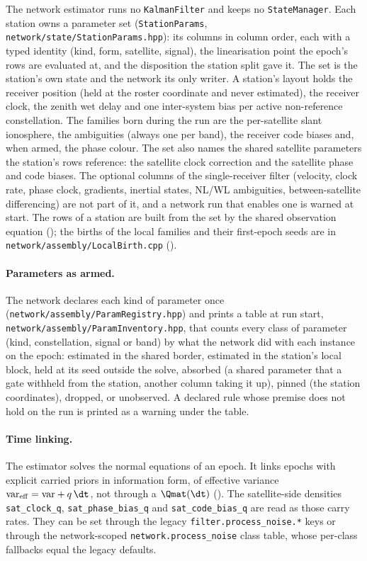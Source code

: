The network estimator runs no \texttt{KalmanFilter} and keeps no
\texttt{StateManager}.  Each station owns a parameter set
(\texttt{StationParams}, \texttt{network/state/StationParams.hpp}): its
columns in column order, each with a typed identity (kind, form, satellite,
signal), the linearisation point the epoch's rows are evaluated at, and the
disposition the station split gave it.  The set is the station's own state
and the network its only writer.  A station's layout holds the receiver
position (held at the roster coordinate and never estimated), the receiver
clock, the zenith wet delay and one inter-system bias per active
non-reference constellation.  The families born during the run are the
per-satellite slant ionosphere, the ambiguities (always one per band), the
receiver code biases and, when armed, the phase colour.  The set also names
the shared satellite parameters the station's rows reference: the satellite
clock correction and the satellite phase and code biases.  The optional
columns of the single-receiver filter (velocity, clock rate, phase clock,
gradients, inertial states, NL/WL ambiguities, between-satellite
differencing) are not part of it, and a network run that enables one is
warned at start.  The rows of a station are built from the set by the
shared observation equation (); the births of the
local families and their first-epoch seeds are in
\texttt{network/assembly/LocalBirth.cpp} ().

\paragraph{Parameters as armed.}
The network declares each kind of parameter once
(\texttt{network/assembly/ParamRegistry.hpp}) and prints a table at run
start, \texttt{network/assembly/ParamInventory.hpp}, that counts every class of
parameter (kind, constellation, signal or band) by what the network did
with each instance on the epoch: estimated in the shared border, estimated
in the station's local block, held at its seed outside the solve, absorbed
(a shared parameter that a gate withheld from the station, another column
taking it up), pinned (the station coordinates), dropped, or unobserved.  A
declared rule whose premise does not hold on the run is printed as a warning
under the table.

\paragraph{Time linking.}
The estimator solves the normal equations of an epoch.  It links epochs
with explicit carried priors in information form, of effective variance
$\mathrm{var}_{\mathrm{eff}} = \mathrm{var} + q\,\dt$, not through a
$\Qmat(\dt)$ ().  The satellite-side
densities \texttt{sat\_clock\_q}, \texttt{sat\_phase\_bias\_q} and
\texttt{sat\_code\_bias\_q} are read as those carry rates.  They can be set
through the legacy \texttt{filter.process\_noise.*} keys or through the
network-scoped \texttt{network.process\_noise} class table, whose per-class
fallbacks equal the legacy defaults.

